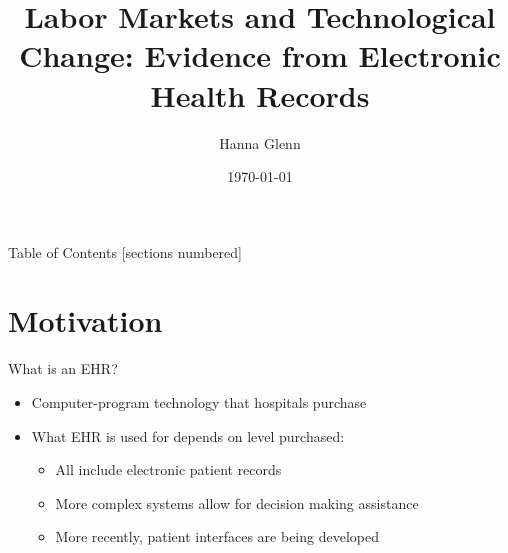 \documentclass[10pt]{beamer}
\title{Labor Markets and Technological Change: Evidence from Electronic Health Records}
\subtitle{Hanna Glenn}
\date{\today}
\begin{document}
\maketitle


\begin{frame}{Table of Contents}
  [sections numbered]
  \tableofcontents%
\end{frame}

\section[Motivation]{Motivation}

\begin{frame}{What is an EHR?}
\begin{itemize}
    \item Computer-program technology that hospitals purchase
    \vspace{3mm}
    \item What EHR is used for depends on level purchased:
    \vspace{2mm}
    \begin{itemize}
        \item All include electronic patient records
        \vspace{2mm}
        \item More complex systems allow for decision making assistance
        \vspace{2mm}
        \item More recently, patient interfaces are being developed
    \end{itemize}
\end{itemize}
\end{frame}
\end{document}
